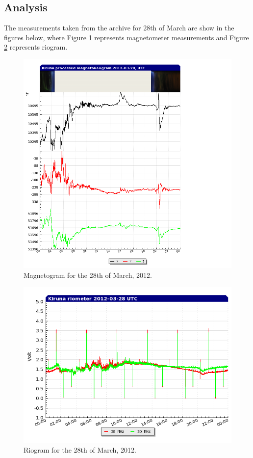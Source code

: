 \documentclass{article}
\begin{document}
\subsection{Analysis}
The measurements taken from the archive for 28th of March are show in the figures below, where Figure \ref{fig:magnetometer} represents magnetometer measurements and Figure \ref{fig:riometer} represents riogram.

\begin{figure}[htbp!]
\centering
\includegraphics[width=1.3\textwidth]{Figures/magnetometer.png}
\caption{Magnetogram for the 28th of March, 2012.}
\label{fig:magnetometer}
\end{figure}

\begin{figure}[htbp!]
\centering
\centerline{\includegraphics[width=1\textwidth]{Figures/riometer.png}}
\caption{Riogram for the 28th of March, 2012.}
\label{fig:riometer}
\end{figure}
\end{document}
